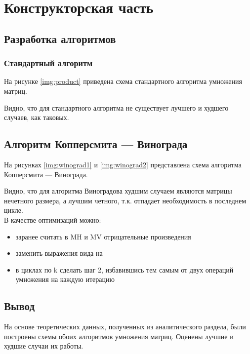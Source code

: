 \chapter{Конструкторская часть}

\section{Разработка алгоритмов}

\subsection{Стандартный алгоритм}

На рисунке \ref{img:product} приведена схема стандартного алгоритма умножения матриц.


Видно, что для стандартного алгоритма не существует лучшего и худшего случаев, как
таковых.


\section{Алгоритм Копперсмита — Винограда}

На рисунках \ref{img:winograd1} и \ref{img:winograd2} представлена схема алгоритма Копперсмита — Винограда.



Видно, что для алгоритма Виноградова худшим случаем являются матрицы нечетного размера, а лучшим четного, т.к. отпадает необходимость в последнем цикле.\\
В качестве оптимизаций можно:
\begin{itemize}
	\item заранее считать в MH и MV отрицательные произведения
	\item заменить выражения вида  на 
	\item в циклах по k сделать шаг 2, избавившись тем самым от двух операций умножения на каждую итерацию
\end{itemize}

\section*{Вывод}

На основе теоретических данных, полученных из аналитического раздела, были построены схемы обоих алгоритмов умножения матриц. Оценены лучшие и
худшие случаи их работы.
